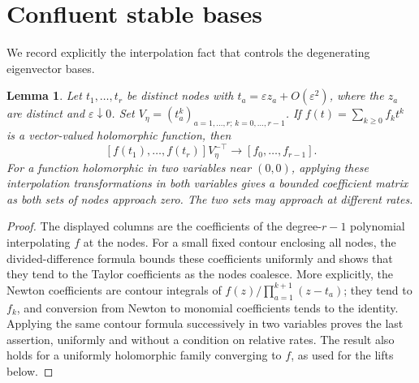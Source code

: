 \documentclass[11pt]{article}
\newtheorem{lemma}[theorem]{Lemma}
\begin{document}
\section{Confluent stable bases}
We record explicitly the interpolation fact that controls the degenerating eigenvector bases.

\begin{lemma}\label{lem:interpolation}
Let $t_1,\ldots,t_r$ be distinct nodes with $t_a=\varepsilon z_a+O(\varepsilon^2)$,
where the $z_a$ are distinct and $\varepsilon\downarrow0$.
Set $V_\eta=(t_a^k)_{a=1,\ldots,r;\,k=0,\ldots,r-1}$.
If $f(t)=\sum_{k\ge0}f_kt^k$ is a vector-valued holomorphic function, then
\[
[f(t_1),\ldots,f(t_r)]V_\eta^{-\top}\longrightarrow[f_0,\ldots,f_{r-1}].
\]
For a function holomorphic in two variables near $(0,0)$, applying these interpolation
transformations in both variables gives a bounded coefficient matrix as both sets of
nodes approach zero. The two sets may approach at different rates.
\end{lemma}
\begin{proof}
The displayed columns are the coefficients of the degree-$r-1$ polynomial interpolating
$f$ at the nodes. For a small fixed contour enclosing all nodes, the divided-difference
formula bounds these coefficients uniformly and shows that they tend to the Taylor
coefficients as the nodes coalesce. More explicitly, the Newton coefficients are contour
integrals of $f(z)/\prod_{a=1}^{k+1}(z-t_a)$; they tend to $f_k$, and conversion from
Newton to monomial coefficients tends to the identity. Applying the same contour formula
successively in two variables proves the last assertion, uniformly and without a condition
on relative rates. The result also holds for a uniformly holomorphic family converging
to $f$, as used for the lifts below.
\end{proof}
\end{document}
